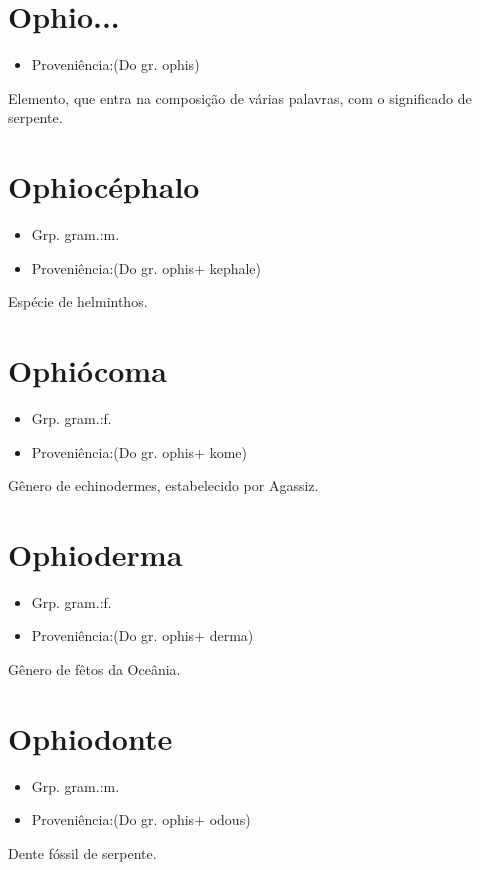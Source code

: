 \section{Ophio...}
\begin{itemize}
\item {Proveniência:(Do gr. \textunderscore ophis\textunderscore )}
\end{itemize}
Elemento, que entra na composição de várias palavras, com o significado de \textunderscore serpente\textunderscore .
\section{Ophiocéphalo}
\begin{itemize}
\item {Grp. gram.:m.}
\end{itemize}
\begin{itemize}
\item {Proveniência:(Do gr. \textunderscore ophis\textunderscore  + \textunderscore kephale\textunderscore )}
\end{itemize}
Espécie de helminthos.
\section{Ophiócoma}
\begin{itemize}
\item {Grp. gram.:f.}
\end{itemize}
\begin{itemize}
\item {Proveniência:(Do gr. \textunderscore ophis\textunderscore  + \textunderscore kome\textunderscore )}
\end{itemize}
Gênero de echinodermes, estabelecido por Agassiz.
\section{Ophioderma}
\begin{itemize}
\item {Grp. gram.:f.}
\end{itemize}
\begin{itemize}
\item {Proveniência:(Do gr. \textunderscore ophis\textunderscore  + \textunderscore derma\textunderscore )}
\end{itemize}
Gênero de fêtos da Oceânia.
\section{Ophiodonte}
\begin{itemize}
\item {Grp. gram.:m.}
\end{itemize}
\begin{itemize}
\item {Proveniência:(Do gr. \textunderscore ophis\textunderscore  + \textunderscore odous\textunderscore )}
\end{itemize}
Dente fóssil de serpente.

